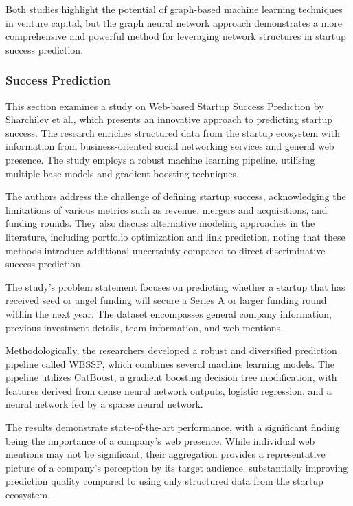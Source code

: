 \documentclass[a4paper, oneside]{discothesis}
\begin{document}
Both studies highlight the potential of graph-based machine learning techniques in venture capital, but the graph neural network approach demonstrates a more comprehensive and powerful method for leveraging network structures in startup success prediction.

\subsubsection{Success Prediction}

This section examines a study on Web-based Startup Success Prediction by Sharchilev et al., which presents an innovative approach to predicting startup success. The research enriches structured data from the startup ecosystem with information from business-oriented social networking services and general web presence. The study employs a robust machine learning pipeline, utilising multiple base models and gradient boosting techniques.

The authors address the challenge of defining startup success, acknowledging the limitations of various metrics such as revenue, mergers and acquisitions, and funding rounds. They also discuss alternative modeling approaches in the literature, including portfolio optimization and link prediction, noting that these methods introduce additional uncertainty compared to direct discriminative success prediction.

The study's problem statement focuses on predicting whether a startup that has received seed or angel funding will secure a Series A or larger funding round within the next year. The dataset encompasses general company information, previous investment details, team information, and web mentions.

Methodologically, the researchers developed a robust and diversified prediction pipeline called WBSSP, which combines several machine learning models. The pipeline utilizes CatBoost, a gradient boosting decision tree modification, with features derived from dense neural network outputs, logistic regression, and a neural network fed by a sparse neural network.

The results demonstrate state-of-the-art performance, with a significant finding being the importance of a company's web presence. While individual web mentions may not be significant, their aggregation provides a representative picture of a company's perception by its target audience, substantially improving prediction quality compared to using only structured data from the startup ecosystem.
\end{document}

